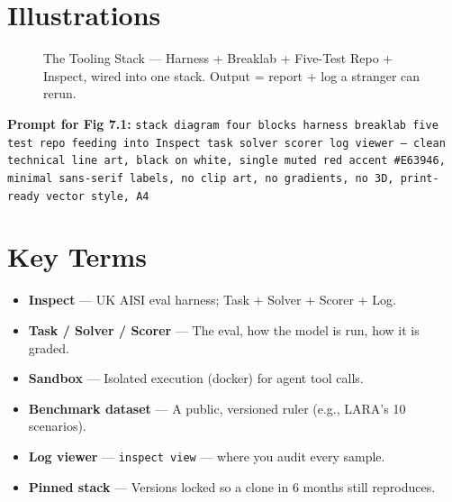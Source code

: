 \section{Illustrations}
\begin{figure}[htbp]
\centering
{}
\caption{The Tooling Stack — Harness + Breaklab + Five-Test Repo + Inspect, wired into one stack. Output = report + log a stranger can rerun.}
\label{fig:7-1}
\end{figure}
\textbf{Prompt for Fig 7.1:} \texttt{stack diagram four blocks harness breaklab five test repo feeding into Inspect task solver scorer log viewer — clean technical line art, black on white, single muted red accent \#E63946, minimal sans-serif labels, no clip art, no gradients, no 3D, print-ready vector style, A4}

\section{Key Terms}
\begin{itemize}
\item \textbf{Inspect} — UK AISI eval harness; Task + Solver + Scorer + Log.
\item \textbf{Task / Solver / Scorer} — The eval, how the model is run, how it is graded.
\item \textbf{Sandbox} — Isolated execution (docker) for agent tool calls.
\item \textbf{Benchmark dataset} — A public, versioned ruler (e.g., LARA's 10 scenarios).
\item \textbf{Log viewer} — \texttt{inspect view} — where you audit every sample.
\item \textbf{Pinned stack} — Versions locked so a clone in 6 months still reproduces.
\end{itemize}

